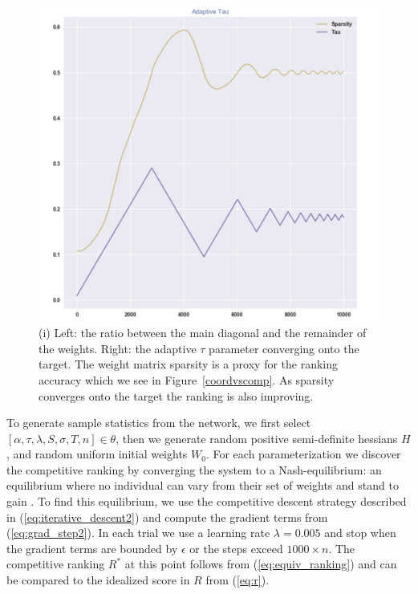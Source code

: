 \documentclass{article}
\begin{document}
\begin{figure}[!htb]
	\centering
	\includegraphics[scale=.27]{images/adaptive_tau.png}
	\caption{(i) Left: the ratio between the main diagonal and the remainder of the weights. Right: the adaptive $\tau$ parameter converging onto the target. The weight matrix sparsity is a proxy for the ranking accuracy which we see in Figure~\ref{coordvscomp}. As sparsity converges onto the target the ranking is also improving.}
	\label{adaptive_tau}
\end{figure}


To generate sample statistics from the network, we first select $[\alpha, \tau, \lambda, S, \sigma, T, n] \in \theta$, then we generate random positive semi-definite hessians $H$, and random uniform initial weights $W_0$. For each parameterization we discover the competitive ranking by converging the system to a Nash-equilibrium: an equilibrium where no individual can vary from their set of weights and stand to gain \cite{dtting2017optimal}. To find this equilibrium, we use the competitive descent strategy described in (\ref{eq:iterative_descent2}) and compute the gradient terms from (\ref{eq:grad_step2}). In each trial we use a learning rate $\lambda = 0.005$ and stop when the gradient terms are bounded by $\epsilon$ or the steps exceed $1000 \times n$. The competitive ranking $R^*$ at this point follows from (\ref{eq:equiv_ranking}) and can be compared to the idealized score in $R$ from (\ref{eq:r}).
\end{document}
